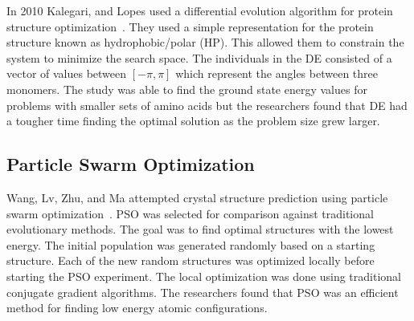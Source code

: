 In 2010 Kalegari, and Lopes used a differential evolution algorithm for protein structure optimization~\cite{kalegari2010differential}. They used a simple representation for the protein structure known as hydrophobic/polar (HP). This allowed them to constrain the system to minimize the search space. The individuals in the DE consisted of a vector of values between $[-\pi, \pi]$ which represent the angles between three monomers. The study was able to find the ground state energy values for problems with smaller sets of amino acids but the researchers found that DE had a tougher time finding the optimal solution as the problem size grew larger.

\subsection{Particle Swarm Optimization}

Wang, Lv, Zhu, and Ma attempted crystal structure prediction using particle swarm optimization~\cite{wang2010crystal}. PSO was selected for comparison against traditional evolutionary methods. The goal was to find optimal structures with the lowest energy. The initial population was generated randomly based on a starting structure. Each of the new random structures was optimized locally before starting the PSO experiment. The local optimization was done using traditional conjugate gradient algorithms. The researchers found that PSO was an efficient method for finding low energy atomic configurations.